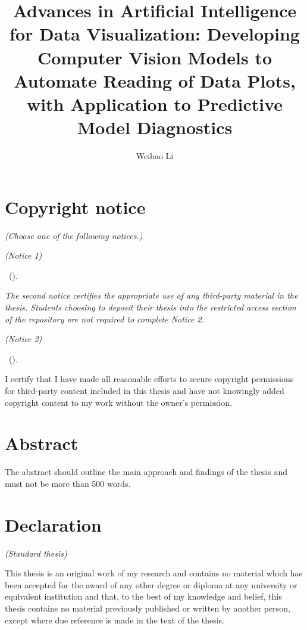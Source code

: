 \documentclass{monashthesis}
\author{Weihao Li}
\title{Advances in Artificial Intelligence for Data Visualization: Developing Computer Vision Models to Automate Reading of Data Plots, with Application to Predictive Model Diagnostics}
\begin{document}

\titlepage

{\sf\tighttoc\doublespacing}

\hypertarget{copyright-notice}{%
\chapter*{Copyright notice}\label{copyright-notice}}

\emph{(Choose one of the following notices.)}

\emph{(Notice 1)}

\textcopyright { } \authorname~(\number\the\year).

\emph{The second notice certifies the appropriate use of any third-party material in the thesis. Students choosing to deposit their thesis into the restricted access section of the repository are not required to complete Notice 2.}

\emph{(Notice 2)}

\textcopyright { } \authorname~(\number\the\year).

I certify that I have made all reasonable efforts to secure copyright permissions for third-party content included in this thesis and have not knowingly added copyright content to my work without the owner's permission.

\newpage

\hypertarget{abstract}{%
\chapter*{Abstract}\label{abstract}}

The abstract should outline the main approach and findings of the thesis and must not be more than 500 words.

\newpage

\hypertarget{declaration}{%
\chapter*{Declaration}\label{declaration}}

\emph{(Standard thesis)}

This thesis is an original work of my research and contains no material which has been accepted for the award of any other degree or diploma at any university or equivalent institution and that, to the best of my knowledge and belief, this thesis contains no material previously published or written by another person, except where due reference is made in the text of the thesis.
\end{document}
